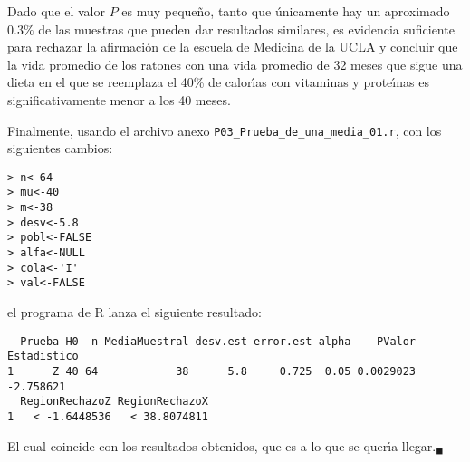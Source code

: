 \begin{solucion}
 \begin{conclusion}
  Dado que el valor $P$ es muy peque\~no,
  tanto que \'unicamente hay un aproximado $0.3\%$ de las muestras
  que pueden dar resultados similares,
  es evidencia suficiente para rechazar la afirmaci\'on de la escuela
  de Medicina de la UCLA y concluir que la vida promedio de los ratones
  con una vida promedio de 32 meses que sigue una dieta
  en el que se reemplaza el 40\% de calor\'{\i}as con vitaminas
  y prote\'{\i}nas es significativamente menor a los 40 meses.
 \end{conclusion}
 Finalmente, usando el archivo anexo \texttt{P03\_Prueba\_de\_una\_media\_01.r}, con los siguientes cambios:
 \begin{verbatim}
> n<-64
> mu<-40
> m<-38
> desv<-5.8
> pobl<-FALSE
> alfa<-NULL
> cola<-'I'
> val<-FALSE
 \end{verbatim}
 \vspace{-0.5cm}
 el programa de R lanza el siguiente resultado:
 \begin{verbatim}
  Prueba H0  n MediaMuestral desv.est error.est alpha    PValor Estadistico
1      Z 40 64            38      5.8     0.725  0.05 0.0029023   -2.758621
  RegionRechazoZ RegionRechazoX
1   < -1.6448536   < 38.8074811
 \end{verbatim}
 \vspace{-0.5cm}
 El cual coincide con los resultados obtenidos, que es a lo que se quer\'{\i}a llegar.${}_{\blacksquare}$
\end{solucion}
